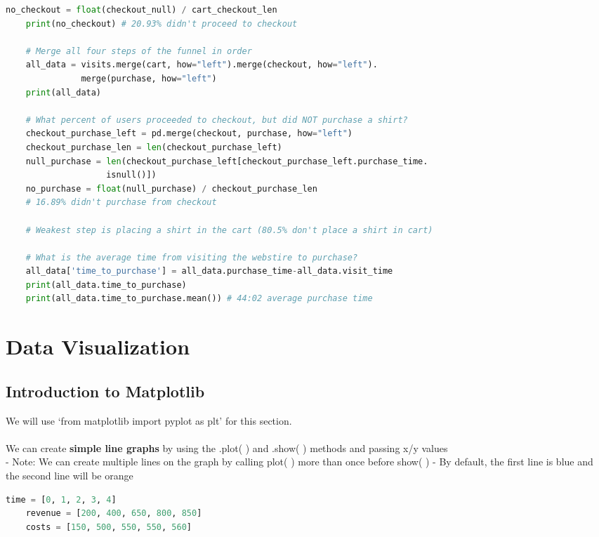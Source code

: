 \documentclass[11pt, a4paper]{article}
\begin{document}
\begin{spacing}{1.1}
\begin{lstlisting}[language=Python]
	no_checkout = float(checkout_null) / cart_checkout_len
	print(no_checkout) # 20.93% didn't proceed to checkout
	
	# Merge all four steps of the funnel in order
	all_data = visits.merge(cart, how="left").merge(checkout, how="left").
	           merge(purchase, how="left") 
	print(all_data)
	
	# What percent of users proceeded to checkout, but did NOT purchase a shirt?
	checkout_purchase_left = pd.merge(checkout, purchase, how="left")
	checkout_purchase_len = len(checkout_purchase_left) 
	null_purchase = len(checkout_purchase_left[checkout_purchase_left.purchase_time.
	                isnull()])
	no_purchase = float(null_purchase) / checkout_purchase_len 
	# 16.89% didn't purchase from checkout
	
	# Weakest step is placing a shirt in the cart (80.5% don't place a shirt in cart)
	
	# What is the average time from visiting the webstire to purchase?
	all_data['time_to_purchase'] = all_data.purchase_time-all_data.visit_time
	print(all_data.time_to_purchase)
	print(all_data.time_to_purchase.mean()) # 44:02 average purchase time \end{lstlisting}\newpage

	\section{Data Visualization}
	\subsection{Introduction to Matplotlib}
	We will use `from matplotlib import pyplot as plt' for this section. \\~\\
	We can create \textbf{simple line graphs} by using the .plot( ) and .show( ) methods and passing x/y values \\
	\hspace*{3mm} - Note: We can create multiple lines on the graph by calling plot( ) more than once before show( )
	\hspace*{3mm} - By default, the first line is blue and the second line will be orange
	\begin{lstlisting}[language=Python]
	time = [0, 1, 2, 3, 4]
	revenue = [200, 400, 650, 800, 850]
	costs = [150, 500, 550, 550, 560]
	

\end{lstlisting}
\end{spacing}
\end{document}
